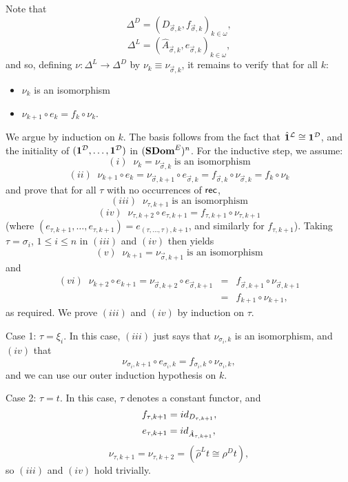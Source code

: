 Note that
\[ {\Delta}^{D} = (D_{\vec{\sigma}, k}, f_{\vec{\sigma}, k})_{k \in \omega}, \]
\[ {\Delta}^{L} = (\hat{A}_{\vec{\sigma}, k}, e_{\vec{\sigma}, k})_{k \in \omega}, \]
and so, defining $\nu : \Delta^{L} \rightarrow \Delta^{D}$ by $\nu_{k} \equiv \nu_{\vec{\sigma}, k}$, it remains to verify that for all $k$:
\begin{itemize}
\item $\nu_{k}$ is an isomorphism
\item $\nu_{k+1} \circ e_{k} = f_{k} \circ \nu_{k}$.
\end{itemize}
We argue by induction on $k$. 
The basis follows from the fact that $\hat{{\bf 1}}^{\cal L} \cong {\bf 1}^{\cal D}$, and the initiality of $({\bf 1}^{\cal D}, \ldots , {\bf 1}^{\cal D})$ in $({\bf SDom}^{E})^{n}$. For the inductive step, we assume:
\[ (i) \;\; \nu_{k} = \nu_{\vec{\sigma}, k} \; \mbox{is an isomorphism} \]
\[ (ii) \;\; \nu_{k+1} \circ e_{k} = \nu_{\vec{\sigma}, k+1} \circ e_{\vec{\sigma}, k} = f_{\vec{\sigma}, k} \circ \nu_{\vec{\sigma}, k} = f_{k} \circ \nu_{k} \]
and prove that for all $\tau$ with no occurrences of ${\sf rec}$,
\[ (iii) \;\; \nu_{\tau , k+1} \; \mbox{is an isomorphism} \]
\[ (iv) \;\; \nu_{\tau , k+2} \circ e_{\tau , k+1} = f_{\tau , k+1} \circ \nu_{\tau , k+1} \]
(where $(e_{\tau , k+1}, \ldots , e_{\tau , k+1}) = e_{(\tau , \ldots , \tau ), k+1}$,
and similarly for $f_{\tau , k+1}$).
Taking $\tau = \sigma_{i}$, $1 \leq i \leq n$ in $(iii)$ and $(iv)$ then yields
\[ (v) \;\; \nu_{k+1} = \nu_{\vec{\sigma}, k+1} \; \mbox{is an isomorphism} \]
and
\begin{eqnarray*}
 (vi) \;\; \nu_{k+2} \circ e_{k+1} = \nu_{\vec{\sigma}, k+2} \circ e_{\vec{\sigma}, k+1} & = & f_{\vec{\sigma}, k+1} \circ \nu_{\vec{\sigma}, k+1}\\
& = & f_{k+1} \circ \nu_{k+1}, 
\end{eqnarray*}
as required. We prove $(iii)$ and $(iv)$ by induction on $\tau$.

\noindent Case 1: $\tau = \xi_{i}$. In this case, $(iii)$ just says that $\nu_{\sigma_{i}, k}$ is an isomorphism, and $(iv)$ that
\[ \nu_{\sigma_{i}, k+1} \circ e_{\sigma_{i}, k} = f_{\sigma_{i}, k} \circ \nu_{\sigma_{i}, k}, \]
and we can use our outer induction hypothesis on $k$.

\noindent Case 2: $\tau = t$. In this case, $\tau$ denotes a constant functor, and
\[ f_{\tau , k+1} = {\sl id}_{D_{\tau , k+1}}, \]
\[ e_{\tau , k+1} = {\sl id}_{\hat{A}_{\tau , k+1}}, \]
\[ \nu_{\tau , k+1} = \nu_{\tau , k+2} = 
(\hat{\rho}^{L} t \cong \rho^{D} t), \]
so $(iii)$ and $(iv)$ hold trivially.

